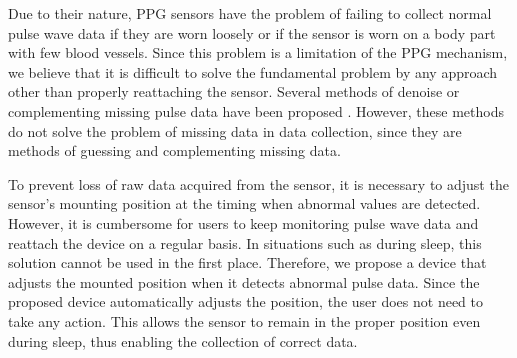\documentclass[sigconf, anonymous]{acmart}
\begin{document}
Due to their nature, PPG sensors have the problem of failing to collect normal pulse wave data if they are worn loosely or if the sensor is worn on a body part with few blood vessels. Since this problem is a limitation of the PPG mechanism, we believe that it is difficult to solve the fundamental problem by any approach other than properly reattaching the sensor. Several methods of denoise or complementing missing pulse data have been proposed \cite{pulse_data_denoise_keerthiveena, pulse_data_denoise_george, pulse_data_denoise_mishra, pulse_data_completion_hangsik}. However, these methods do not solve the problem of missing data in data collection, since they are methods of guessing and complementing missing data.\par

To prevent loss of raw data acquired from the sensor, it is necessary to adjust the sensor's mounting position at the timing when abnormal values are detected. However, it is cumbersome for users to keep monitoring pulse wave data and reattach the device on a regular basis. In situations such as during sleep, this solution cannot be used in the first place. Therefore, we propose a device that adjusts the mounted position when it detects abnormal pulse data. Since the proposed device automatically adjusts the position, the user does not need to take any action. This allows the sensor to remain in the proper position even during sleep, thus enabling the collection of correct data.\par
\end{document}
